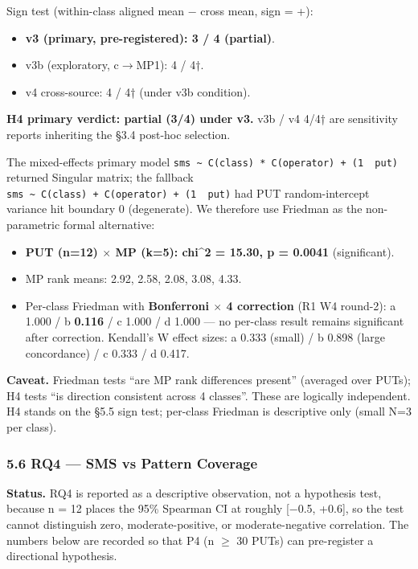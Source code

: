 \documentclass[review,12pt,authoryear]{elsarticle}
\providecommand{\tightlist}{\setlength{\itemsep}{0pt}\setlength{\parskip}{0pt}}
\begin{document}
Sign test (within-class aligned mean − cross mean, sign = +):

\begin{itemize}
\tightlist
\item
  \textbf{v3 (primary, pre-registered): 3 / 4 (partial)}.
\item
  v3b (exploratory, c$\to$MP1): 4 / 4†.
\item
  v4 cross-source: 4 / 4† (under v3b condition).
\end{itemize}

\textbf{H4 primary verdict: partial (3/4) under v3.} v3b / v4 4/4† are
sensitivity reports inheriting the §3.4 post-hoc selection.

The mixed-effects primary model
\texttt{sms\ \textasciitilde{}\ C(class)\ *\ C(operator)\ +\ (1\ \textbar{}\ put)}
returned Singular matrix; the fallback
\texttt{sms\ \textasciitilde{}\ C(class)\ +\ C(operator)\ +\ (1\ \textbar{}\ put)}
had PUT random-intercept variance hit boundary 0 (degenerate). We
therefore use Friedman as the non-parametric formal alternative:

\begin{itemize}
\tightlist
\item
  \textbf{PUT (n=12) $\times$ MP (k=5): chi\^{}2 = 15.30, p = 0.0041}
  (significant).
\item
  MP rank means: 2.92, 2.58, 2.08, 3.08, 4.33.
\item
  Per-class Friedman with \textbf{Bonferroni $\times$ 4 correction} (R1 W4
  round-2): a 1.000 / b \textbf{0.116} / c 1.000 / d 1.000 --- no
  per-class result remains significant after correction. Kendall's W
  effect sizes: a 0.333 (small) / b 0.898 (large concordance) / c 0.333
  / d 0.417.
\end{itemize}

\textbf{Caveat.} Friedman tests ``are MP rank differences present''
(averaged over PUTs); H4 tests ``is direction consistent across 4
classes''. These are logically independent. H4 stands on the §5.5 sign
test; per-class Friedman is descriptive only (small N=3 per class).

\subsubsection{5.6 RQ4 --- SMS vs Pattern
Coverage}\label{rq4-sms-vs-pattern-coverage}

\textbf{Status.} RQ4 is reported as a descriptive observation, not a
hypothesis test, because n = 12 places the 95\% Spearman CI at roughly
{[}−0.5, +0.6{]}, so the test cannot distinguish zero,
moderate-positive, or moderate-negative correlation. The numbers below
are recorded so that P4 (n $\geq$ 30 PUTs) can pre-register a directional
hypothesis.
\end{document}

